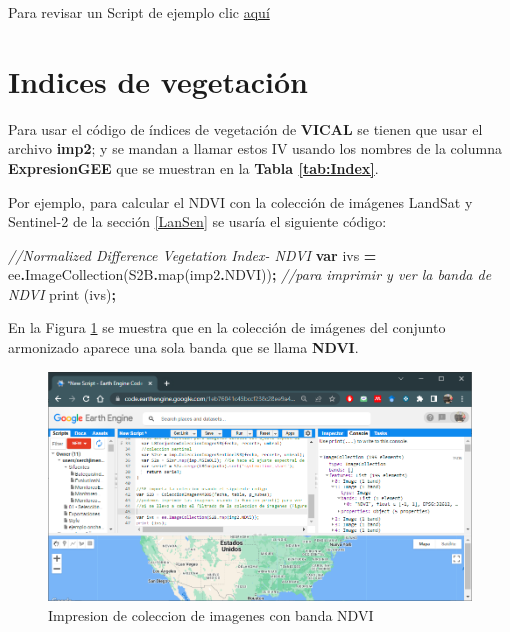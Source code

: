 \documentclass[
]{book}
\newenvironment{Shaded}{\begin{snugshade}}{\end{snugshade}}
\newcommand{\AttributeTok}[1]{\textcolor[rgb]{0.77,0.63,0.00}{#1}}
\newcommand{\CommentTok}[1]{\textcolor[rgb]{0.56,0.35,0.01}{\textit{#1}}}
\newcommand{\FunctionTok}[1]{\textcolor[rgb]{0.00,0.00,0.00}{#1}}
\newcommand{\KeywordTok}[1]{\textcolor[rgb]{0.13,0.29,0.53}{\textbf{#1}}}
\newcommand{\NormalTok}[1]{#1}
\newcommand{\OperatorTok}[1]{\textcolor[rgb]{0.81,0.36,0.00}{\textbf{#1}}}
\begin{document}
Para revisar un Script de ejemplo clic \href{https://code.earthengine.google.com/1eb76041c45bccf238c28ee9a4bad955}{aquí}

\hypertarget{indices-de-vegetaciuxf3n}{%
\section{Indices de vegetación}\label{indices-de-vegetaciuxf3n}}

Para usar el código de índices de vegetación de \textbf{VICAL} se tienen que usar el archivo \textbf{imp2}; y se mandan a llamar estos IV usando los nombres de la columna \textbf{ExpresionGEE} que se muestran en la \textbf{Tabla \ref{tab:Index}}.

Por ejemplo, para calcular el NDVI con la colección de imágenes LandSat y Sentinel-2 de la sección \ref{LanSen} se usaría el siguiente código:

\begin{Shaded}
\begin{Highlighting}[]
\CommentTok{//Normalized Difference Vegetation Index{-} NDVI}
\KeywordTok{var}\NormalTok{ ivs }\OperatorTok{=}\NormalTok{ ee}\OperatorTok{.}\FunctionTok{ImageCollection}\NormalTok{(S2B}\OperatorTok{.}\FunctionTok{map}\NormalTok{(imp2}\OperatorTok{.}\AttributeTok{NDVI}\NormalTok{))}\OperatorTok{;}
\CommentTok{//para imprimir y ver la banda de NDVI}
\FunctionTok{print}\NormalTok{ (ivs)}\OperatorTok{;}
\end{Highlighting}
\end{Shaded}

En la Figura \ref{fig:figV4} se muestra que en la colección de imágenes del conjunto armonizado aparece una sola banda que se llama \textbf{NDVI}.

\begin{figure}

{\centering \includegraphics[width=0.85\linewidth]{./images/Figure73} 

}

\caption{Impresion de coleccion de imagenes con banda NDVI}\label{fig:figV4}
\end{figure}
\end{document}
